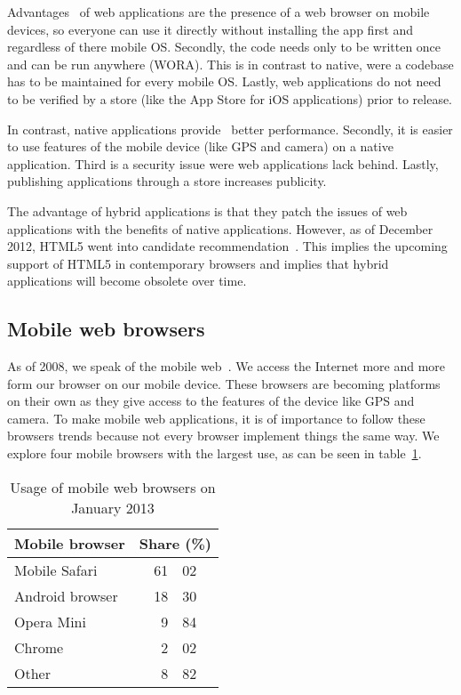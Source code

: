 \documentclass[a4paper]{artikel3}
\begin{document}
Advantages~\cite{Accenture2012} of web applications are the presence of a web browser on mobile devices, so everyone can use it directly without installing the app first and regardless of there mobile OS.
Secondly, the code needs only to be written once and can be run anywhere (WORA).
This is in contrast to native, were a codebase has to be maintained for every mobile OS.
Lastly, web applications do not need to be verified by a store (like the App Store for iOS applications) prior to release.

In contrast, native applications provide~\cite{Accenture2012} better performance.
Secondly, it is easier to use features of the mobile device (like GPS and camera) on a native application.
Third is a security issue were web applications lack behind.
Lastly, publishing applications through a store increases publicity.

The advantage of hybrid applications is that they patch the issues of web applications with the benefits of native applications.
However, as of December 2012, HTML5 went into candidate recommendation~\cite{Jacobs2012}.
This implies the upcoming support of HTML5 in contemporary browsers and implies that hybrid applications will become obsolete over time.

\subsection{Mobile web browsers}
As of 2008, we speak of the mobile web~\cite{Hales2012}.
We access the Internet more and more form our browser on our mobile device.
These browsers are becoming platforms on their own as they give access to the features of the device like GPS and camera. 
To make mobile web applications, it is of importance to follow these browsers trends because not every browser implement things the same way.
We explore four mobile browsers with the largest use, as can be seen in table~\ref{table:mobile-browsers}.

\begin{table}
\centering
\begin{tabular}[b]{l r@{.}l}
\toprule
Mobile browser    	& \multicolumn{2}{c}{Share (\%)} \\
\midrule
Mobile Safari		& 61 	& 02	 	\\
Android browser		& 18 	& 30 	\\
Opera Mini			& 9 		& 84 	\\
Chrome				& 2		& 02 	\\
Other				& 8		& 82		\\
\bottomrule
\end{tabular}
\caption{Usage of mobile web browsers on January 2013 \protect\cite{NetApplications2012}}
\label{table:mobile-browsers}
\end{table}
\end{document}
